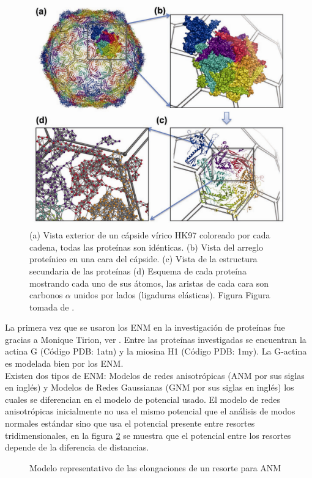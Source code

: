\begin{figure}
\centering%
\includegraphics[scale=0.28]{Kap2/dibujo.pdf}%
\caption{ (a) Vista exterior de un c\'{a}pside v\'{i}rico HK97 coloreado por cada cadena, todas las prote\'{i}nas son id\'{e}nticas. (b) Vista del arreglo prote\'{i}nico en una cara del c\'{a}pside. (c) Vista de la estructura secundaria de las prote\'{i}nas (d) Esquema de cada prote\'{i}na mostrando cada uno de sus \'{a}tomos, las aristas de cada cara son carbonos $\alpha$ unidos por lados (ligaduras el\'{a}sticas). Figura Figura tomada de \cite{Lezon2009}.} \label{fig:pan}
\end{figure}

La primera vez que se usaron los ENM en la investigaci\'{o}n de prote\'{i}nas fue gracias a Monique Tirion, ver \cite{Tirion1996}. Entre las prote\'{i}nas  investigadas se encuentran la actina G (C\'{o}digo PDB: 1atn) y la miosina H1 (C\'{o}digo PDB: 1my). La G-actina es modelada bien por los ENM.\\ 

Existen dos tipos de ENM: Modelos de redes anisotr\'{o}picas (ANM por sus siglas en ingl\'{e}s) y Modelos de Redes Gaussianas (GNM por sus siglas en ingl\'{e}s) los cuales se diferencian en el modelo de potencial usado.  El modelo de redes anisotr\'{o}picas inicialmente no usa el mismo potencial que el an\'{a}lisis de modos normales est\'{a}ndar sino que usa el potencial presente entre resortes tridimensionales, en la figura \ref{fig:ANM} se muestra que el potencial entre los resortes depende de la diferencia de distancias.\\
\begin{figure}
\centering
%
\caption{Modelo representativo de las elongaciones de un resorte para ANM} \label{fig:ANM}
\end{figure}
